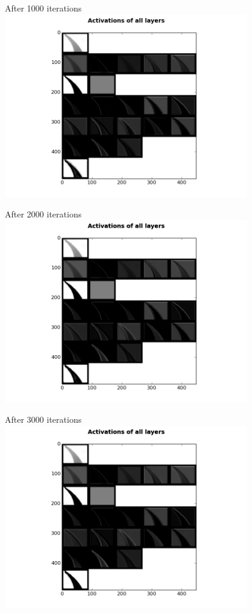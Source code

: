 \begin{frame}{After 1000 iterations}
\includegraphics[height=8.0cm]{data/activations/output-1000.png}\\ 
\end{frame}

\begin{frame}{After 2000 iterations}
\includegraphics[height=8.0cm]{data/activations/output-2000.png}\\ 
\end{frame}

\begin{frame}{After 3000 iterations}
\includegraphics[height=8.0cm]{data/activations/output-3000.png}\\ 
\end{frame}

